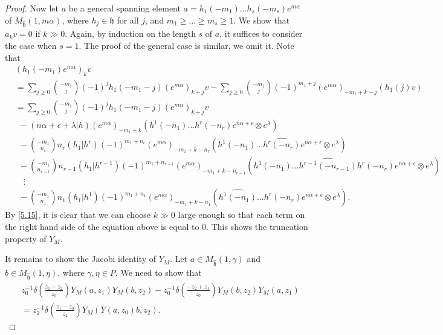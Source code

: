 \documentclass[12pt,a4paper,reqno]{amsart}
\numberwithin{equation}{section}
\numberwithin{equation}{section}
\theoremstyle{definition}
\def\la{\lambda}
\def \al{\alpha}
\def \ga {\gamma}
\def \h {\mathfrak{h}}
\def\ds{\dots}
\def\o{\otimes}
\begin{document}
\begin{proof}
		Now let $a$ be a general spanning element $a=h_1(-m_1)\ds h_s(-m_s)e^{m\al}$ of $ M_{\hat{\h}}(1,m\al)$, where $h_j\in \h$ for all $j$, and $m_1\geq\ds \geq m_s\geq 1$. We show that $a_kv=0$ if $k\gg 0$. Again, by induction on the length $s$ of $a$, it suffices to consider the case when $s=1$. The proof of the general case is similar, we omit it. Note that 
		\begin{align*}
			&(h_1(-m_1)e^{m\al})_kv\\
			&=\sum_{j\geq 0}\binom{-m_1}{j}(-1)^j h_1(-m_1-j)(e^{m\al})_{k+j}v-\sum_{j\geq 0} \binom{-m_1}{j} (-1)^{m_1+j} (e^{m\al})_{-m_1+k-j}(h_1(j)v)\\
			&=\sum_{j\geq 0}\binom{-m_1}{j}(-1)^j h_1(-m_1-j)(e^{m\al})_{k+j}v\\
			&\ \ -(n\al+\epsilon+\la|h) (e^{m\al})_{-m_1+k} \left(h^1(-n_1)\ds h^r(-n_r)e^{n\al+\epsilon}\o e^\la\right)\\
			&\ \ -\binom{-m_1}{n_r} n_r(h_1|h^r) (-1)^{m_1+n_r} (e^{m\al})_{-m_1+k-n_r} \left(h^1(-n_1)\ds \widehat{h^r(-n_r)}e^{n\al+\epsilon}\o e^\la\right)\\
			&\ \ -\binom{-m_1}{n_{r-1}} n_{r-1}(h_1|h^{r-1})(-1)^{m_1+n_{r-1}} (e^{m\al})_{-m_1+k-n_{r-1}}\left(h^1(-n_1)\ds \widehat{h^{r-1}(-n_{r-1})}h^r(-n_r)e^{n\al+\epsilon}\o e^\la\right)\\
			&\quad \vdots\\
			&\ \ -\binom{-m_1}{n_1}n_1(h_1|h^1)(-1)^{m_1+n_1}(e^{m\al})_{-m_1+k-n_1}\left(\widehat{h^1(-n_1)}\ds h^r(-n_r)e^{n\al+\epsilon}\o e^\la\right).
		\end{align*}
		By \eqref{5.15}, it is clear that we can choose $k\gg 0$ large enough so that each term on the right hand side of the equation above is equal to $0$. This shows the truncation property of $Y_M$. 
		
		It remains to show the Jacobi identity of $Y_M$. Let $a\in M_{\hat{\h}}(1,\ga)$ and $b\in M_{\hat{\h}}(1,\eta)$, where $\ga,\eta\in P$. We need to show that 
		\begin{equation}\label{5.16}
			\begin{aligned}
				&z_0^{-1}\delta\left(\frac{z_1-z_2}{z_0}\right) Y_M(a,z_1)Y_M(b,z_2)-	z_0^{-1}\delta\left(\frac{-z_2+z_1}{z_0}\right) Y_M(b,z_2)Y_M(a,z_1)\\
				&=	z_2^{-1}\delta\left(\frac{z_1-z_0}{z_2}\right) Y_M(Y(a,z_0)b,z_2).
			\end{aligned}
		\end{equation}
		

\end{proof}
\end{document}
